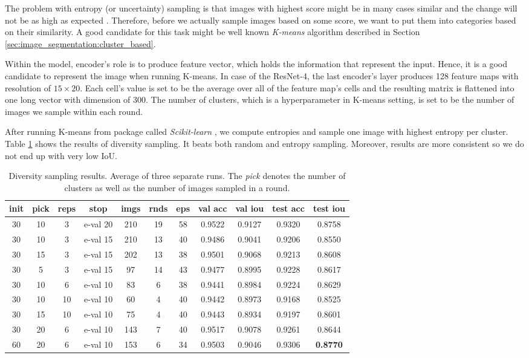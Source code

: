 The problem with entropy (or uncertainty) sampling is that images with highest score
might be in many cases similar and the change will not be as high as expected
\cite{bib:sener2017active, bib:yang2017suggestive, bib:zhdanov2019diverse}.
Therefore, before we actually sample images based on some score, we want to put them
into categories based on their similarity. A good candidate for this task might be
well known \textit{K-means} algorithm described in Section
\ref{sec:image_segmentation:cluster_based}.

Within the model, encoder's role is to produce feature vector, which holds the information
that represent the input. Hence, it is a good candidate to represent the image
when running K-means.
In case of the ResNet-4, the last encoder's layer produces 128 feature maps
with resolution of $15\times 20$. Each cell's value is set to be the average over all of the
feature map's cells and the resulting matrix is flattened into one long vector with
dimension of 300. The number of clusters, which is a hyperparameter in K-means setting,
is set to be the number of images we sample within each round. 

After running K-means from package called \textit{Scikit-learn} \cite{bib:pedregosa2011scikit},
we compute entropies and sample one image with highest entropy per
cluster. Table \ref{tab:diversity_sampling} shows the results of diversity sampling.
It beats both random and entropy sampling. Moreover, results are more consistent so we do not
end up with very low IoU.

\begin{table}[h]
	\centering
	\begin{tabular}{|c|c|c|c||c|c|c|c|c|c|c|} 
	\hline
	init & pick & reps & stop & imgs & rnds & eps & val acc & val iou & test acc & test iou \\
	\hline
    30 & 10 &  3 & e-val 20 & 210 & 19 & 58 & 0.9522 & 0.9127 & 0.9320 & 0.8758 \\
    30 & 10 &  3 & e-val 15 & 210 & 13 & 40 & 0.9486 & 0.9041 & 0.9206 & 0.8550 \\
    30 & 15 &  3 & e-val 15 & 202 & 13 & 38 & 0.9501 & 0.9068 & 0.9213 & 0.8608 \\
    30 &  5 &  3 & e-val 15 & 97 & 14 & 43 & 0.9477 & 0.8995 & 0.9228 & 0.8617 \\
    30 & 10 &  6 & e-val 10 & 83 & 6 & 38 & 0.9441 & 0.8984 & 0.9224 & 0.8629 \\
    30 & 10 & 10 & e-val 10 & 60 & 4 & 40 & 0.9442 & 0.8973 & 0.9168 & 0.8525 \\
    30 & 15 & 10 & e-val 10 & 75 & 4 & 40 & 0.9443 & 0.8934 & 0.9197 & 0.8601 \\
    30 & 20 &  6 & e-val 10 & 143 & 7 & 40 & 0.9517 & 0.9078 & 0.9261 & 0.8644 \\
    60 & 20 &  6 & e-val 10 & 153 & 6 & 34 & 0.9503 & 0.9046 & 0.9306 & \textbf{0.8770} \\
	\hline
	\end{tabular}
	\caption[Diversity sampling results]{Diversity sampling results. Average of three
	separate runs. The \textit{pick} denotes
	the number of clusters as well as the number of images sampled in a round.}
	\label{tab:diversity_sampling}
\end{table}

